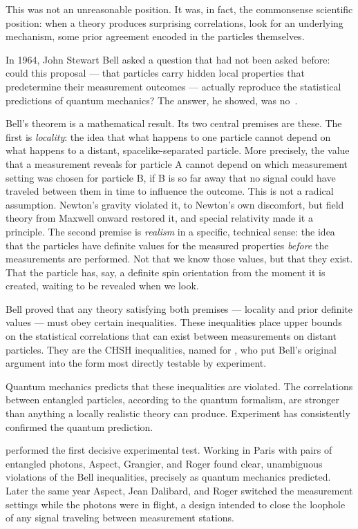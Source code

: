 This was not an unreasonable position.
It was, in fact, the commonsense scientific position: when a theory produces
surprising correlations, look for an underlying mechanism, some prior agreement
encoded in the particles themselves.

In 1964, John Stewart Bell asked a question that had not been asked before:
could this proposal --- that particles carry hidden local properties that
predetermine their measurement outcomes --- actually reproduce the statistical
predictions of quantum mechanics?
The answer, he showed, was no~\citep{Bell1964}.

Bell's theorem is a mathematical result.
Its two central premises are these.
The first is \emph{locality}: the idea that what happens to one particle cannot
depend on what happens to a distant, spacelike-separated particle.
More precisely, the value that a measurement reveals for particle A cannot depend
on which measurement setting was chosen for particle B, if B is so far away that
no signal could have traveled between them in time to influence the outcome.
This is not a radical assumption.
Newton's gravity violated it, to Newton's own discomfort, but field theory from
Maxwell onward restored it, and special relativity made it a principle.
The second premise is \emph{realism} in a specific, technical sense: the idea that
the particles have definite values for the measured properties \emph{before} the
measurements are performed.
Not that we know those values, but that they exist.
That the particle has, say, a definite spin orientation from the moment it is
created, waiting to be revealed when we look.

Bell proved that any theory satisfying both premises --- locality and prior definite
values --- must obey certain inequalities.
These inequalities place upper bounds on the statistical correlations that can
exist between measurements on distant particles.
They are the CHSH inequalities, named for \citet{CHSH1969}, who put Bell's
original argument into the form most directly testable by experiment.

Quantum mechanics predicts that these inequalities are violated.
The correlations between entangled particles, according to the quantum formalism,
are stronger than anything a locally realistic theory can produce.
Experiment has consistently confirmed the quantum prediction.

\citet{Aspect1982} performed the first decisive experimental test.
Working in Paris with pairs of entangled photons, Aspect, Grangier, and Roger
found clear, unambiguous violations of the Bell inequalities, precisely as
quantum mechanics predicted.
Later the same year Aspect, Jean Dalibard, and Roger switched the measurement
settings while the photons were in flight, a design intended to close the
loophole of any signal traveling between measurement stations.

